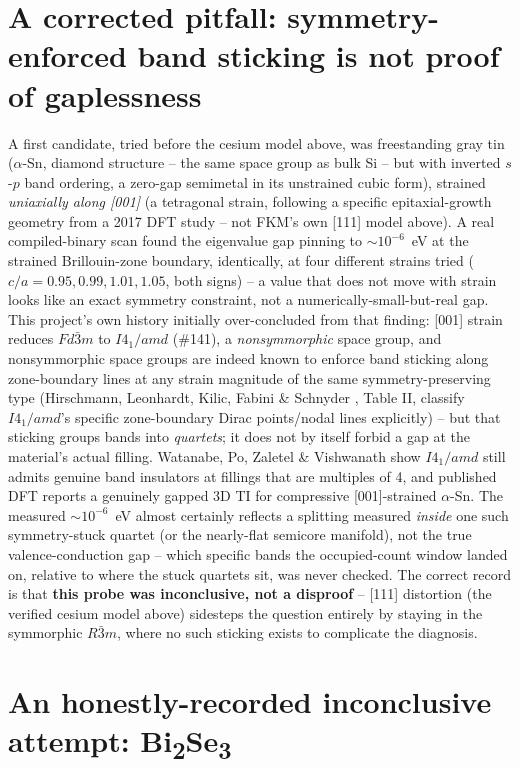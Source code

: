 \documentclass[11pt]{article}
\begin{document}
\section{A corrected pitfall: symmetry-enforced band sticking is not proof of gaplessness}

A first candidate, tried before the cesium model above, was freestanding gray tin
($\alpha$-Sn, diamond structure -- the same space group as bulk Si -- but with inverted
$s$-$p$ band ordering, a zero-gap semimetal in its unstrained cubic form), strained
\emph{uniaxially along [001]} (a tetragonal strain, following a specific epitaxial-growth
geometry from a 2017 DFT study \cite{huangliu2017} -- not FKM's own [111] model above).
A real compiled-binary scan found the eigenvalue gap pinning to $\sim10^{-6}$~eV at the
strained Brillouin-zone boundary, identically, at four different strains tried
($c/a=0.95,0.99,1.01,1.05$, both signs) -- a value that does not move with strain looks
like an exact symmetry constraint, not a numerically-small-but-real gap. This project's
own history initially over-concluded from that finding: [001] strain reduces $Fd\bar3m$
to $I4_1/amd$ (\#141), a \emph{nonsymmorphic} space group, and nonsymmorphic space
groups are indeed known to enforce band sticking along zone-boundary lines at any strain
magnitude of the same symmetry-preserving type (Hirschmann, Leonhardt, Kilic, Fabini \&
Schnyder \cite{hirschmann2021}, Table II, classify $I4_1/amd$'s specific zone-boundary
Dirac points/nodal lines explicitly) -- but that sticking groups bands into
\emph{quartets}; it does not by itself forbid a gap at the material's actual filling.
Watanabe, Po, Zaletel \& Vishwanath \cite{watanabe2016} show $I4_1/amd$ still admits
genuine band insulators at fillings that are multiples of 4, and published DFT
\cite{huangliu2017} reports a genuinely gapped 3D TI for compressive [001]-strained
$\alpha$-Sn. The measured $\sim10^{-6}$~eV almost certainly reflects a splitting
measured \emph{inside} one such symmetry-stuck quartet (or the nearly-flat semicore
manifold), not the true valence-conduction gap -- which specific bands the occupied-count
window landed on, relative to where the stuck quartets sit, was never checked. The
correct record is that \textbf{this probe was inconclusive, not a disproof} -- [111]
distortion (the verified cesium model above) sidesteps the question entirely by staying
in the symmorphic $R\bar3m$, where no such sticking exists to complicate the diagnosis.

\section{An honestly-recorded inconclusive attempt: Bi\textsubscript{2}Se\textsubscript{3}}
\end{document}
